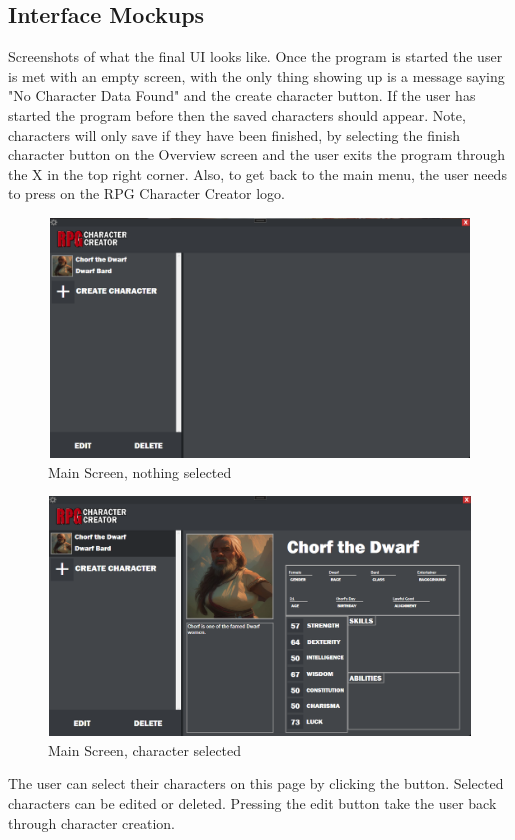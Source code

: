 \documentclass[10pt,conference,onecolumn,compsoc]{IEEEtran}
\begin{document}
\subsection{Interface Mockups}
	Screenshots of what the final UI looks like. Once the program is started the user is met with an empty screen, with the only thing showing up is a message saying "No Character Data Found" and the create character button. If the user has started the program before then the saved characters should appear. Note, characters will only save if they have been finished, by selecting the finish character button on the Overview screen and the user exits the program through the X in the top right corner. Also, to get back to the main menu, the user needs to press on the RPG Character Creator logo.
\begin{figure}[H]
\includegraphics[height=240px, width=426px]{Finished Interface/mainScreen.png}
\caption{Main Screen, nothing selected}
\centering
\end{figure}
\begin{figure}[H]
\includegraphics[height=240px, width=426px]{Finished Interface/mainScreenSelected.png}
\caption{Main Screen, character selected}
\centering
\end{figure}
The user can select their characters on this page by clicking the button. Selected characters can be edited or deleted. Pressing the edit button take the user back through character creation.
\end{document}
